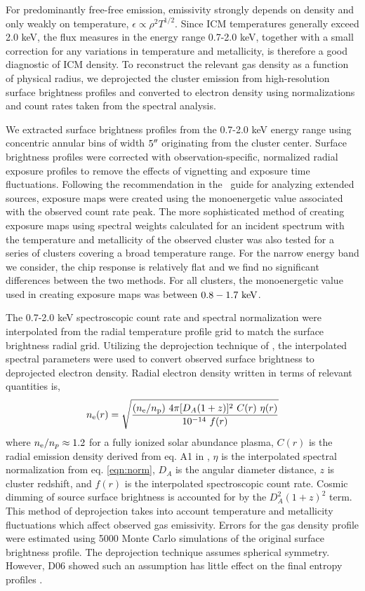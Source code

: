 \documentclass[12pt,preprint]{aastex}
\begin{document}
For predominantly free-free emission, emissivity strongly depends on
density and only weakly on temperature, $\epsilon \propto \rho^2
T^{1/2}$. Since ICM temperatures generally exceed 2.0 keV, the flux
measures in the energy range 0.7-2.0 keV, together with a small
correction for any variations in temperature and metallicity, is
therefore a good diagnostic of ICM density. To reconstruct the
relevant gas density as a function of physical radius, we deprojected
the cluster emission from high-resolution surface brightness profiles
and converted to electron density using normalizations and count rates
taken from the spectral analysis.

We extracted surface brightness profiles from the 0.7-2.0 keV energy
range using concentric annular bins of width $5\mathrm{^\prime}\hskip -0.1em\mathrm{^\prime}$ originating from
the cluster center. Surface brightness profiles were corrected with
observation-specific, normalized radial exposure profiles to remove
the effects of vignetting and exposure time fluctuations. Following
the recommendation in the \ciao\ guide for analyzing extended sources,
exposure maps were created using the monoenergetic value associated
with the observed count rate peak. The more sophisticated method of
creating exposure maps using spectral weights calculated for an
incident spectrum with the temperature and metallicity of the observed
cluster was also tested for a series of clusters covering a broad
temperature range. For the narrow energy band we consider, the chip
response is relatively flat and we find no significant differences
between the two methods. For all clusters, the monoenergetic value
used in creating exposure maps was between $0.8-1.7\mbox{\ensuremath{\mathrm{~keV}}}$.

The 0.7-2.0 keV spectroscopic count rate and spectral normalization
were interpolated from the radial temperature profile grid to match
the surface brightness radial grid. Utilizing the deprojection
technique of \citet{kriss83}, the interpolated spectral parameters were
used to convert observed surface brightness to deprojected electron
density. Radial electron density written in terms of relevant
quantities is,
\begin{equation}
n_{\mathrm{e}}(r) = \sqrt{\frac{(n_{\mathrm{e}}/n_{\mathrm{p}})~4 \pi [D_A(1+z)]^2~C(r)~\eta(r)}{10^{-14}~f(r)}}
\end{equation}
where $n_{\mathrm{e}}/n_p \approx 1.2$ for a fully ionized solar abundance
plasma, $C(r)$ is the radial emission density derived from eq. A1 in
\citet{kriss83}, $\eta$ is the interpolated spectral normalization
from eq. \ref{eqn:norm}, $D_A$ is the angular diameter distance, $z$
is cluster redshift, and $f(r)$ is the interpolated spectroscopic
count rate. Cosmic dimming of source surface brightness is accounted
for by the $D_A^2 (1+z)^2$ term. This method of deprojection takes
into account temperature and metallicity fluctuations which affect
observed gas emissivity. Errors for the gas density profile were
estimated using 5000 Monte Carlo simulations of the original surface
brightness profile. The \citet{kriss83} deprojection technique assumes
spherical symmetry. However, D06 showed such an assumption has little
effect on the final entropy profiles \citep[see also][for the low
impact of spherical symmetry assumptions for deriving density
profiles]{2003ApJ...598..190D, 2005MNRAS.359.1481B}.
\end{document}
